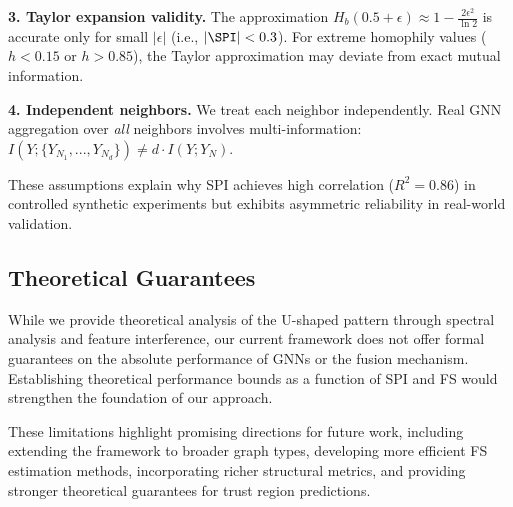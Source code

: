 \textbf{3. Taylor expansion validity.} The approximation $H_b(0.5 + \epsilon) \approx 1 - \frac{2\epsilon^2}{\ln 2}$ is accurate only for small $|\epsilon|$ (i.e., $|\SPI| < 0.3$). For extreme homophily values ($h < 0.15$ or $h > 0.85$), the Taylor approximation may deviate from exact mutual information.

\textbf{4. Independent neighbors.} We treat each neighbor independently. Real GNN aggregation over \textit{all} neighbors involves multi-information: $I(Y; \{Y_{N_1}, ..., Y_{N_d}\}) \neq d \cdot I(Y; Y_N)$.

These assumptions explain why SPI achieves high correlation ($R^2 = 0.86$) in controlled synthetic experiments but exhibits asymmetric reliability in real-world validation.

\subsection{Theoretical Guarantees}

While we provide theoretical analysis of the U-shaped pattern through spectral analysis and feature interference, our current framework does not offer formal guarantees on the absolute performance of GNNs or the fusion mechanism. Establishing theoretical performance bounds as a function of SPI and FS would strengthen the foundation of our approach.

These limitations highlight promising directions for future work, including extending the framework to broader graph types, developing more efficient FS estimation methods, incorporating richer structural metrics, and providing stronger theoretical guarantees for trust region predictions.
